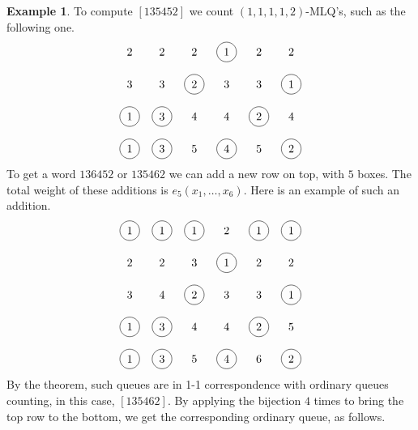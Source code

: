 \documentclass[submission]{FPSAC2018}
\newcommand{\0}{\phantom{c}}
\theoremstyle{plain}
\theoremstyle{definition}
\newtheorem{example}[thm]{Example}
\numberwithin{equation}{section}
\begin{document}
\begin{example}
To compute $[135452]$ we count $(1,1,1,1,2)$-MLQ's, such as the following one.
\[
\begin{tikzpicture}\node at (0, 4){2};\node at (1, 4){2};\node at (2, 4){2};\node[circle, draw=black] at (3, 4){1};\node at (4, 4){2};\node at (5, 4){2};\node at (0, 3){3};\node at (1, 3){3};\node[circle, draw=black] at (2, 3){2};\node at (3, 3){3};\node at (4, 3){3};\node[circle, draw=black] at (5, 3){1};\node[circle, draw=black] at (0, 2){1};\node[circle, draw=black] at (1, 2){3};\node at (2, 2){4};\node at (3, 2){4};\node[circle, draw=black] at (4, 2){2};\node at (5, 2){4};\node[circle, draw=black] at (0, 1){1};\node[circle, draw=black] at (1, 1){3};\node at (2, 1){5};\node[circle, draw=black] at (3, 1){4};\node at (4, 1){5};\node[circle, draw=black] at (5, 1){2};\end{tikzpicture}
\]
To get a word $136452$ or $135462$ we can add a new row on top, with $5$ boxes. The total weight of these additions is $e_5(x_1, \dots, x_6)$. Here is an example of such an addition.
\[
\begin{tikzpicture}\node[circle, draw=black] at (0, 5){1};\node[circle, draw=black] at (1, 5){1};\node[circle, draw=black] at (2, 5){1};\node at (3, 5){2};\node[circle, draw=black] at (4, 5){1};\node[circle, draw=black] at (5, 5){1};\node at (0, 4){2};\node at (1, 4){2};\node at (2, 4){3};\node[circle, draw=black] at (3, 4){1};\node at (4, 4){2};\node at (5, 4){2};\node at (0, 3){3};\node at (1, 3){4};\node[circle, draw=black] at (2, 3){2};\node at (3, 3){3};\node at (4, 3){3};\node[circle, draw=black] at (5, 3){1};\node[circle, draw=black] at (0, 2){1};\node[circle, draw=black] at (1, 2){3};\node at (2, 2){4};\node at (3, 2){4};\node[circle, draw=black] at (4, 2){2};\node at (5, 2){5};\node[circle, draw=black] at (0, 1){1};\node[circle, draw=black] at (1, 1){3};\node at (2, 1){5};\node[circle, draw=black] at (3, 1){4};\node at (4, 1){6};\node[circle, draw=black] at (5, 1){2};\end{tikzpicture}
\]
By the theorem, such queues are in 1-1 correspondence with ordinary queues counting, in this case, $[135462]$. By applying the bijection $4$ times to bring the top row to the bottom, we get the corresponding ordinary queue, as follows.\\


\end{example}
\end{document}
